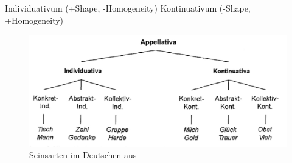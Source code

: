\begin{exe}
	\ex \label{ex:seinsarten}
	\begin{xlist}
		\ex \label{ex:indi} Individuativum (+Shape, -Homogeneity)
		\ex \label{ex:konti} Kontinuativum (-Shape, +Homogeneity)
 	\end{xlist}
\end{exe}

\begin{figure}
\begin{center}
\includegraphics[width=12cm]{images/zifonun-seinarten-neu.jpg}
\caption {Seinsarten im Deutschen aus \textcite[104]{Zifonun2012}\label{abb:zifonun-seinsarten}}
\end{center}
\end{figure}

